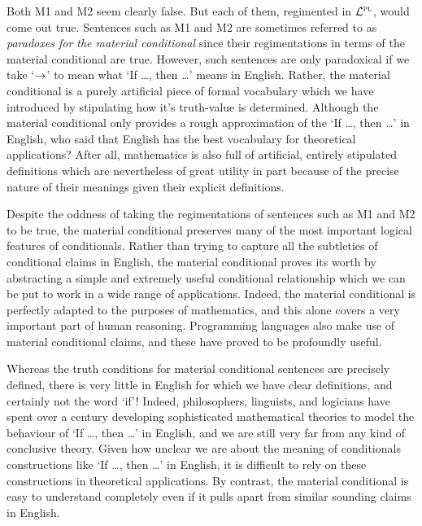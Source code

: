 Both M1 and M2 seem clearly false.
But each of them, regimented in $\mathcal{L}^{\textsc{pl}}$, would come out true.
Sentences such as M1 and M2 are sometimes referred to as \textit{paradoxes for the material conditional} since their regimentations in terms of the material conditional are true.
However, such sentences are only paradoxical if we take `$\rightarrow$' to mean what `If \ldots, then \ldots' means in English.
Rather, the material conditional is a purely artificial piece of formal vocabulary which we have introduced by stipulating how it's truth-value is determined.
Although the material conditional only provides a rough approximation of the `If \ldots, then \ldots' in English, who said that English has the best vocabulary for theoretical applications?
After all, mathematics is also full of artificial, entirely stipulated definitions which are nevertheless of great utility in part because of the precise nature of their meanings given their explicit definitions.

Despite the oddness of taking the regimentations of sentences such as M1 and M2 to be true, the material conditional preserves many of the most important logical features of conditionals.
Rather than trying to capture all the subtleties of conditional claims in English, the material conditional proves its worth by abstracting a simple and extremely useful conditional relationship which we can be put to work in a wide range of applications.
Indeed, the material conditional is perfectly adapted to the purposes of mathematics, and this alone covers a very important part of human reasoning.
Programming languages also make use of material conditional claims, and these have proved to be profoundly useful.

Whereas the truth conditions for material conditional sentences are precisely defined, there is very little in English for which we have clear definitions, and certainly not the word `if'!
Indeed, philosophers, linguists, and logicians have spent over a century developing sophisticated mathematical theories to model the behaviour of `If \ldots, then \ldots' in English, and we are still very far from any kind of conclusive theory.
Given how unclear we are about the meaning of conditionals constructions like `If \ldots, then \ldots' in English, it is difficult to rely on these constructions in theoretical applications.
By contrast, the material conditional is easy to understand completely even if it pulls apart from similar sounding claims in English.

